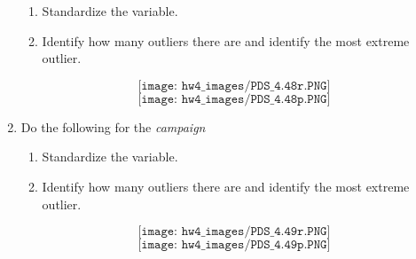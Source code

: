 \documentclass[11pt]{article}
\theoremstyle{definition}
\newcommand{\1}[1]{\mathbf{1} \left \{ #1 \right \}}
\begin{document}
\begin{enumerate}
\begin{enumerate}[(1)]
        \item Standardize the variable.
        \item Identify how many outliers there are and identify the most extreme outlier.
    \end{enumerate}
    \[\texttt{[image: hw4\_images/PDS\_4.48r.PNG]}\]
    \[\texttt{[image: hw4\_images/PDS\_4.48p.PNG]}\]
    \item Do the following for the \textit{campaign}
    \begin{enumerate}[(1)]
        \item Standardize the variable.
        \item Identify how many outliers there are and identify the most extreme outlier.
        \end{enumerate}
        \[\texttt{[image: hw4\_images/PDS\_4.49r.PNG]}\]
        \[\texttt{[image: hw4\_images/PDS\_4.49p.PNG]}\]
\end{enumerate}
\end{document}
